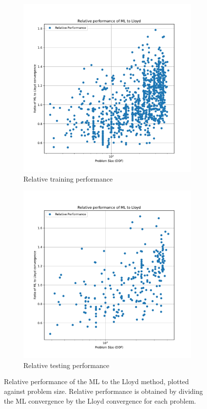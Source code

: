 \documentclass{article}
\begin{document}
\begin{figure}[h]
  \centering
  \begin{subfigure}[t]{0.49\textwidth}
    \centering
    \includegraphics[width=\textwidth]{rel_perf_train.pdf}
    \caption{Relative training performance}
  \end{subfigure}
  \begin{subfigure}[t]{0.49\textwidth}
    \centering
    \includegraphics[width=\textwidth]{rel_perf_test.pdf}
    \caption{Relative testing performance}
  \end{subfigure}
  \caption{Relative performance of the ML to the Lloyd method, plotted against problem size.  Relative performance is obtained by dividing the ML convergence by the Lloyd convergence for each problem.}
  \label{fig:rel_conv}
\end{figure}
\end{document}
